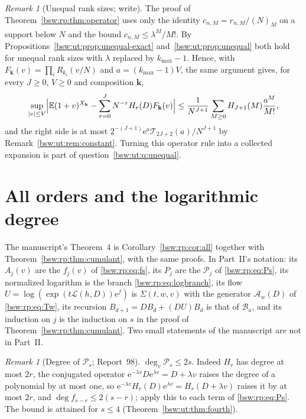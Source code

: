 \documentclass[11pt,letterpaper]{article}
\theoremstyle{definition}
\theoremstyle{remark}
\newtheorem{remark}[theorem]{Remark}
\newcommand{\EE}{\mathbb E}
\newcommand{\ee}{\mathrm e}
\newcommand{\fall}[2]{(#1)_{\underline{#2}}}
\begin{document}
\begin{remark}[Unequal rank sizes; write]\label{bsw:ut:rem:operator-unequal}
The proof of Theorem~\ref{bsw:rp:thm:operator} uses only the
identity $c_{n,M}=r_{n,M}/\fall NM$ on a support below $N$ and the bound
$c_{n,M}\le\lambda^M/M!$.  By
Propositions~\ref{bsw:ut:prop:unequal-exact}
and~\ref{bsw:ut:prop:unequal} both hold for unequal rank sizes with
$\lambda$ replaced by $k_{\max}-1$.  Hence, with
$F_{\mathbf k}(v)=\prod_iR_{k_i}(v/N)$ and $a=(k_{\max}-1)V$, the same
argument gives, for every $J\ge0$, $V\ge0$ and composition $\mathbf k$,
\[
 \sup_{|v|\le V}\Bigl|\EE(1+v)^{X_{\mathbf k}}
 -\sum_{r=0}^JN^{-r}H_r(D)F_{\mathbf k}(v)\Bigr|
 \le\frac1{N^{J+1}}\sum_{M\ge0}H_{J+1}(M)\frac{a^M}{M!},
\]
and the right side is at most $2^{-(J+1)}\ee^a\mathcal T_{2J+2}(a)/N^{J+1}$
by Remark~\ref{bsw:ut:rem:constant}.  Turning this operator rule into a collected expansion is
part of question~\ref{bsw:ut:q:unequal}.
\end{remark}

\section{All orders and the logarithmic degree}\label{bsw:ut:sec:allorders}

The manuscript's Theorem~4 is Corollary~\ref{bsw:rp:cor:all} together with
Theorem~\ref{bsw:rp:thm:cumulant}, with the same proofs.  In Part~II's
notation: its $A_j(v)$ are the $f_j(v)$ of \eqref{bsw:rp:eq:fs}, its $P_j$
are the $\mathcal P_j$ of \eqref{bsw:rp:eq:Ps}, its normalized logarithm is
the branch \eqref{bsw:rp:eq:logbranch}, its flow
$U=\log(\exp(t\mathcal L(h,D))\ee^f)$ is $\Sigma(t,w,v)$ with the
generator $\mathcal A_w(D)$ of \eqref{bsw:rp:eq:Tw}, its recursion
$B_{d+1}=DB_d+(DU)B_d$ is that of $\mathcal B_a$, and its induction on $j$
is the induction on $s$ in the proof of Theorem~\ref{bsw:rp:thm:cumulant}.
Two small statements of the manuscript are not in Part~II.

\begin{remark}[Degree of $\mathcal P_s$; Report~98]\label{bsw:ut:rem:degP}
$\deg_v\mathcal P_s\le2s$.  Indeed $H_r$ has degree at most $2r$, the
conjugated operator $\ee^{-\lambda v}D\ee^{\lambda v}=D+\lambda v$ raises
the degree of a polynomial by at most one, so
$\ee^{-\lambda v}H_r(D)\ee^{\lambda v}=H_r(D+\lambda v)$ raises it by at
most $2r$, and $\deg f_{s-r}\le2(s-r)$; apply this to each term of
\eqref{bsw:rp:eq:Ps}.  The bound is attained for $s\le4$
(Theorem~\ref{bsw:ut:thm:fourth}).
\end{remark}
\end{document}

